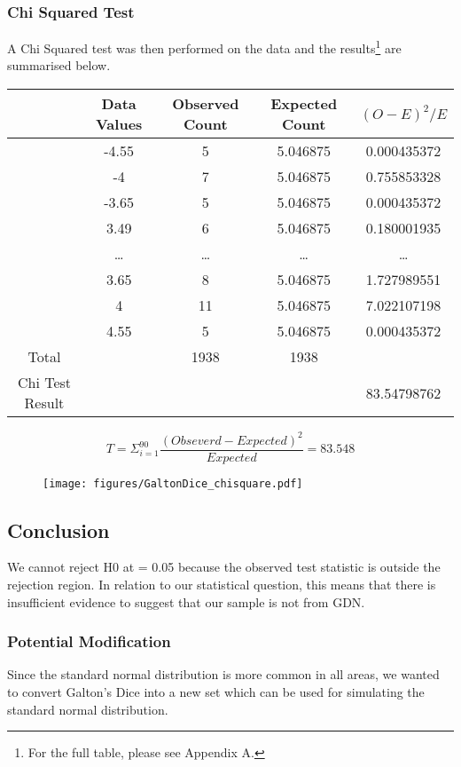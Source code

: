 \subsubsection*{Chi Squared Test}
A Chi Squared test was then performed on the data and the results\footnote{For the full table, please see Appendix A.} are summarised below. 
	
\begin{tabular}{|c|c|c|c|c|}\hline
&Data Values	&Observed Count&	Expected Count&	$(O-E)^2/E$\\ \hline
	&-4.55	&5&	5.046875&	0.000435372\\
	&-4&	7	&5.046875&	0.755853328\\
	&-3.65	&5&	5.046875&	0.000435372\\
	&3.49&	6	&5.046875	&0.180001935\\
	&\ldots &	\ldots&\ldots&\ldots\\
	&3.65&	8	&5.046875	&1.727989551\\
	&4	&11	&5.046875&7.022107198\\
	&4.55&	5	&5.046875	&0.000435372\\
Total	&& 	1938	&1938	 &\\\hline
Chi Test Result	 	 &&&&	 	83.54798762\\\hline
\end{tabular}



$$T=\Sigma_{i=1}^{90} \frac{(Obseverd-Expected)^2}{Expected} = 83.548$$

\begin{figure}[thp]
\begin{center}
\texttt{[image: figures/GaltonDice\_chisquare.pdf]}
\end{center}
\end{figure}
 

\subsection{Conclusion}
We cannot reject H0 at   = 0.05 because the observed test statistic is outside the rejection region. In relation to our statistical question, this means that there is insufficient evidence to suggest that our sample is not from GDN. 

 
\subsubsection*{Potential Modification}
Since the standard normal distribution is more common in all areas, we wanted to convert Galton's Dice into a new set which can be used for simulating the standard normal distribution. 

